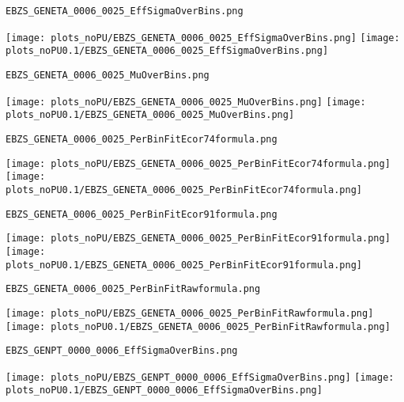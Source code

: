 \begin{frame}[fragile]
\begin{verbatim}
EBZS_GENETA_0006_0025_EffSigmaOverBins.png
\end{verbatim}
\texttt{[image: plots\_noPU/EBZS\_GENETA\_0006\_0025\_EffSigmaOverBins.png]}
\texttt{[image: plots\_noPU0.1/EBZS\_GENETA\_0006\_0025\_EffSigmaOverBins.png]}
\end{frame}
\begin{frame}[fragile]
\begin{verbatim}
EBZS_GENETA_0006_0025_MuOverBins.png
\end{verbatim}
\texttt{[image: plots\_noPU/EBZS\_GENETA\_0006\_0025\_MuOverBins.png]}
\texttt{[image: plots\_noPU0.1/EBZS\_GENETA\_0006\_0025\_MuOverBins.png]}
\end{frame}
\begin{frame}[fragile]
\begin{verbatim}
EBZS_GENETA_0006_0025_PerBinFitEcor74formula.png
\end{verbatim}
\texttt{[image: plots\_noPU/EBZS\_GENETA\_0006\_0025\_PerBinFitEcor74formula.png]}
\texttt{[image: plots\_noPU0.1/EBZS\_GENETA\_0006\_0025\_PerBinFitEcor74formula.png]}
\end{frame}
\begin{frame}[fragile]
\begin{verbatim}
EBZS_GENETA_0006_0025_PerBinFitEcor91formula.png
\end{verbatim}
\texttt{[image: plots\_noPU/EBZS\_GENETA\_0006\_0025\_PerBinFitEcor91formula.png]}
\texttt{[image: plots\_noPU0.1/EBZS\_GENETA\_0006\_0025\_PerBinFitEcor91formula.png]}
\end{frame}
\begin{frame}[fragile]
\begin{verbatim}
EBZS_GENETA_0006_0025_PerBinFitRawformula.png
\end{verbatim}
\texttt{[image: plots\_noPU/EBZS\_GENETA\_0006\_0025\_PerBinFitRawformula.png]}
\texttt{[image: plots\_noPU0.1/EBZS\_GENETA\_0006\_0025\_PerBinFitRawformula.png]}
\end{frame}
\begin{frame}[fragile]
\begin{verbatim}
EBZS_GENPT_0000_0006_EffSigmaOverBins.png
\end{verbatim}
\texttt{[image: plots\_noPU/EBZS\_GENPT\_0000\_0006\_EffSigmaOverBins.png]}
\texttt{[image: plots\_noPU0.1/EBZS\_GENPT\_0000\_0006\_EffSigmaOverBins.png]}
\end{frame}
